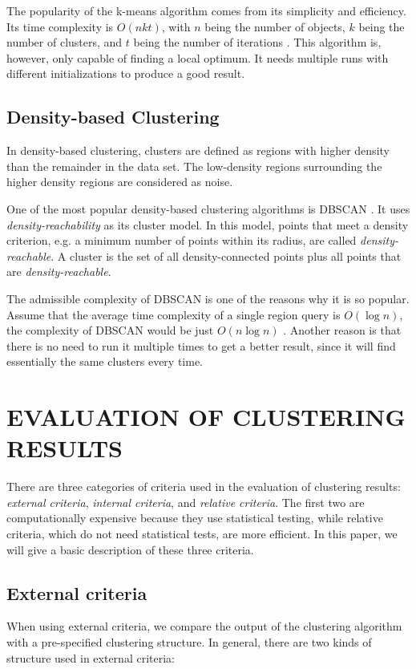 \documentclass[conference]{IEEEtran}
\begin{document}
The popularity of the k-means algorithm comes from its simplicity and efficiency. Its time complexity is $O(nkt)$, with $n$ being the number of objects, $k$ being the number of clusters, and $t$ being the number of iterations \cite{dong2009k}. This algorithm is, however, only capable of finding a local optimum. It needs multiple runs with different initializations to produce a good result.

\subsection{Density-based Clustering}
In density-based clustering, clusters are defined as regions with higher density than the remainder in the data set. The low-density regions surrounding the higher density regions are considered as noise.

One of the most popular density-based clustering algorithms is DBSCAN \cite{ester1996density}. It uses \textit{density-reachability} as its cluster model. In this model, points that meet a density criterion, e.g. a minimum number of points within its radius, are called \textit{density-reachable}. A cluster is the set of all density-connected points plus all points that are \textit{density-reachable}.

The admissible complexity of DBSCAN is one of the reasons why it is so popular. Assume that the average time complexity of a single region query is $O(\log n)$, the complexity of DBSCAN would be just $O(n \log n)$ \cite{ester1996density}. Another reason is that there is no need to run it multiple times to get a better result, since it will find essentially the same clusters every time.

\section{EVALUATION OF CLUSTERING RESULTS} \label{sec:evaluation}

There are three categories of criteria used in the evaluation of clustering results: \textit{external criteria}, \textit{internal criteria}, and \textit{relative criteria}. The first two are computationally expensive because they use statistical testing, while relative criteria, which do not need statistical tests, are more efficient. In this paper, we will give a basic description of these three criteria.

\subsection{External criteria}
When using external criteria, we compare the output of the clustering algorithm with a pre-specified clustering structure. In general, there are two kinds of structure used in external criteria:
\end{document}
